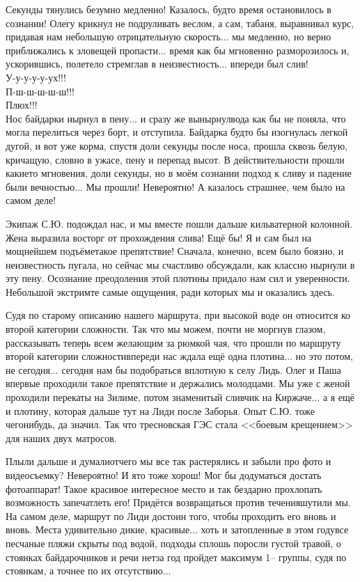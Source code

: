 Секунды тянулись безумно медленно! Казалось, будто время остановилось в сознании! Олегу крикнул не подруливать веслом, а сам, табаня, выравнивал курс, придавая нам небольшую отрицательную скорость$\ldots$ мы медленно, но верно приближались к зловещей пропасти$\ldots$ время как бы мгновенно разморозилось и, ускорившись, полетело стремглав в неизвестность$\ldots$ впереди был слив!\\
У-у-у-у-у-ух!!!\\
\hspace*{25mm} П-ш-ш-ш-ш-ш!!!\\
\hspace*{56mm} Плюх!!!\\
\noindent Нос байдарки нырнул в пену$\ldots$ и сразу же вынырнул\mdash вода как бы не поняла, что могла перелиться через борт, и отступила. Байдарка будто бы изогнулась легкой дугой, и вот уже корма, спустя доли секунды после носа, прошла сквозь белую, кричащую, словно в ужасе, пену и перепад высот. В действительности прошли какие\sdash то мгновения, доли секунды, но в моём сознании подход к сливу и падение были вечностью$\ldots$ Мы прошли! Невероятно! А казалось страшнее, чем было на самом деле! 
 
Экипаж С.Ю. подождал нас, и мы вместе пошли дальше кильватерной колонной. Жена выразила восторг от прохождения слива! Ещё бы! Я и сам был на мощнейшем подъёме\mdash такое препятствие! Сначала, конечно, всем было боязно, и неизвестность пугала, но сейчас мы счастливо обсуждали, как классно нырнули в эту пену. Осознание преодоления этой плотины придало нам сил и уверенности. Небольшой экстрим\mdash те самые ощущения, ради которых мы и оказались здесь. 

Судя по старому описанию нашего маршрута, при высокой воде он относится ко второй категории сложности. Так что мы можем, почти не моргнув глазом, рассказывать теперь всем желающим за рюмкой чая, что прошли по маршруту второй категории сложности\mdash впереди нас ждала ещё одна плотина$\ldots$ но это потом, не сегодня$\ldots$ сегодня нам бы подобраться вплотную к селу Лидь. Олег и Паша впервые проходили такое препятствие и держались молодцами. Мы уже с женой проходили перекаты на Зилиме, потом знаменитый сливчик на Киржаче$\ldots$ а я ещё и плотину, которая дальше тут на Лиди после Заборья. Опыт С.Ю. тоже чего\sdash нибудь, да значил. Так что тресновская ГЭС стала <<боевым крещением>> для наших двух матросов.

Плыли дальше и думали\mdash отчего мы все так растерялись и забыли про фото и видеосъемку? Невероятно! И я\sdash то тоже хорош! Мог бы додуматься достать фотоаппарат! Такое красивое интересное место и так бездарно прохлопать возможность запечатлеть его! Придётся возвращаться против течения\mdash шутили мы. На самом деле, маршрут по Лиди достоин того, чтобы проходить его вновь и вновь. Места удивительно дикие, красивые$\ldots$ хоть и затопленные в этом году\mdash все песчаные пляжи скрыты под водой, подходы сплошь поросли густой травой, о стоянках байдарочников и речи нет\mdash за год пройдет максимум 1\thinspace\nobreakdash-- группы, судя по стоянкам, а точнее по их отсутствию$\ldots$

